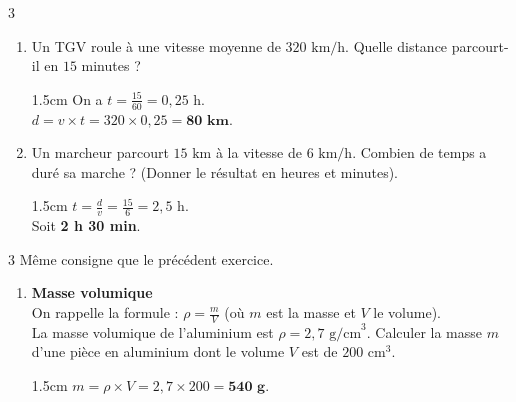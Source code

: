 \documentclass[a4paper]{book}
\begin{document}
{\begin{exerciceNote}{3}
\begin{enumerate}[leftmargin=*]
            \begin{ZoneReponse}{1.5cm}                
            On a $t = 2,25 \text{ h}$. \\
            $v = \frac{d}{t} = \frac{180}{2,25} = \mathbf{80 \text{ km/h}}$.
            \end{ZoneReponse}

            \item Un TGV roule à une vitesse moyenne de $320 \text{ km/h}$. Quelle distance parcourt-il en $15$ minutes ? 

            \begin{ZoneReponse}{1.5cm}                
            On a $t = \frac{15}{60} = 0,25 \text{ h}$. \\
            $d = v \times t = 320 \times 0,25 = \mathbf{80 \text{ km}}$.
            \end{ZoneReponse}

            \item Un marcheur parcourt $15 \text{ km}$ à la vitesse de $6 \text{ km/h}$. Combien de temps a duré sa marche ? (Donner le résultat en heures et minutes).

            \begin{ZoneReponse}{1.5cm}                
            $t = \frac{d}{v} = \frac{15}{6} = 2,5 \text{ h}$. \\
            Soit \textbf{2 h 30 min}.
            \end{ZoneReponse}
        \end{enumerate}        
    \end{exerciceNote}


    \begin{exerciceNote}{3}
        Même consigne que le précédent exercice.
        \begin{enumerate}[leftmargin=*]
            \item \textbf{Masse volumique} \\
            On rappelle la formule : $\rho = \frac{m}{V}$ (où $m$ est la masse et $V$ le volume). \\
            La masse volumique de l'aluminium est $\rho = 2,7 \text{ g/cm}^3$. 
            Calculer la masse $m$ d'une pièce en aluminium dont le volume $V$ est de $200 \text{ cm}^3$.

            \begin{ZoneReponse}{1.5cm}                
            $m = \rho \times V = 2,7 \times 200 = \mathbf{540 \text{ g}}$.
            \end{ZoneReponse}
            

\end{enumerate}
\end{exerciceNote}}
\end{document}
